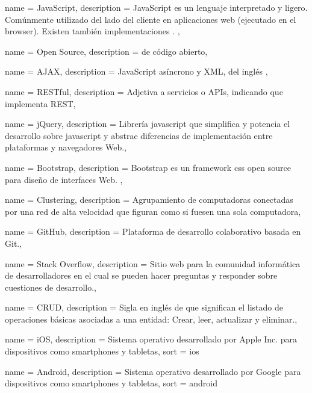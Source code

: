 \newpage

 {
  name = {JavaScript},
  description = {JavaScript es un lenguaje interpretado y ligero. Comúnmente utilizado del lado del cliente en aplicaciones web (ejecutado en el browser). Existen también implementaciones . },
}


 {
  name = {Open Source},
  description = { de código abierto},
}

 {
  name = {AJAX},
  description = {JavaScript asíncrono y XML, del inglés  },
}

 {
  name = {RESTful},
  description = {Adjetiva a servicios o APIs, indicando que implementa REST},
}

 {
  name = {jQuery},
  description = {Librería \gls{javascript} que simplifica y potencia el desarrollo sobre \gls{javascript} y abstrae diferencias de implementación entre plataformas y navegadores Web.},
}

 {
  name = {Bootstrap},
  description = {Bootstrap es un \gls{framework} \gls{css} \gls{open source} para diseño de interfaces Web. },
}

 {
  name = {Clustering},
  description = {Agrupamiento de computadoras conectadas por una red de alta velocidad que figuran como si fuesen una sola computadora},
}

 {
  name = {GitHub},
  description = {Plataforma de desarrollo colaborativo basada en Git.},
}

 {
  name = {Stack Overflow},
  description = {Sitio web para la comunidad informática de desarrolladores en el cual se pueden hacer preguntas y responder sobre cuestiones de desarrollo.},
}

 {
  name = {CRUD},
  description = {Sigla en inglés de  que significan el listado de operaciones básicas asociadas a una entidad: Crear, leer, actualizar y eliminar.},
}

 {
  name = {iOS},
  description = {Sistema operativo desarrollado por Apple Inc. para dispositivos
  como smartphones y tabletas}, sort = {ios}
}

 {
  name = {Android},
  description = {Sistema operativo desarrollado por Google para dispositivos
  como smartphones y tabletas},
  sort = {android}
}

